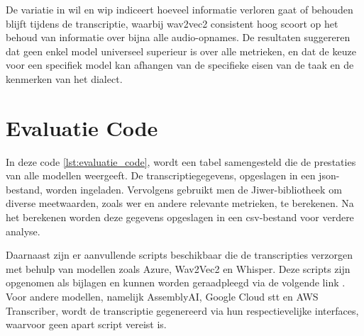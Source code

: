 De variatie in \gls{wil} en \gls{wip} indiceert hoeveel informatie verloren gaat of behouden blijft tijdens de transcriptie, waarbij wav2vec2 consistent hoog scoort op het behoud van informatie over bijna alle audio-opnames. De resultaten suggereren dat geen enkel model universeel superieur is over alle metrieken, en dat de keuze voor een specifiek model kan afhangen van de specifieke eisen van de taak en de kenmerken van het dialect.

\section{Evaluatie Code}

In deze code \ref{lst:evaluatie_code}, wordt een tabel samengesteld die de prestaties van alle modellen weergeeft. De transcriptiegegevens, opgeslagen in een \gls{json}-bestand, worden ingeladen. Vervolgens gebruikt men de Jiwer-bibliotheek om diverse meetwaarden, zoals \gls{wer} en andere relevante metrieken, te berekenen. Na het berekenen worden deze gegevens opgeslagen in een \gls{csv}-bestand voor verdere analyse.

Daarnaast zijn er aanvullende scripts beschikbaar die de transcripties verzorgen met behulp van modellen zoals Azure, Wav2Vec2 en Whisper. Deze scripts zijn opgenomen als bijlagen en kunnen worden geraadpleegd via de volgende link \autocite{AitCheikhAhmed2024}. Voor andere modellen, namelijk AssemblyAI, Google Cloud \gls{stt} en AWS Transcriber, wordt de transcriptie gegenereerd via hun respectievelijke interfaces, waarvoor geen apart script vereist is.

